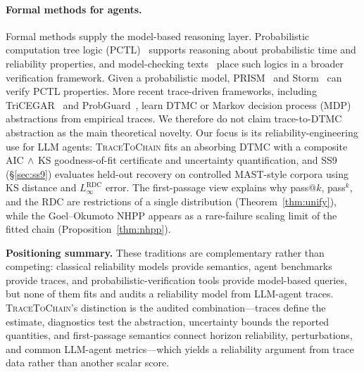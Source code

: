 \paragraph{Formal methods for agents.}
Formal methods supply the model-based reasoning layer. Probabilistic
computation tree logic (PCTL)~\cite{hansson1994pctl} supports
reasoning about probabilistic time and reliability properties, and
model-checking texts~\cite{baier2008principles} place such logics in a
broader verification framework. Given a probabilistic model,
PRISM~\cite{prism2011} and Storm~\cite{storm2017} can verify PCTL
properties. More recent trace-driven frameworks, including
TriCEGAR~\cite{tricegar2026} and ProbGuard~\cite{pro2guard2025}, learn
DTMC or Markov decision process (MDP) abstractions from empirical
traces. We therefore do not claim trace-to-DTMC abstraction as the
main theoretical novelty. Our focus is its reliability-engineering use
for LLM agents: \textsc{TraceToChain} fits an absorbing DTMC with a
composite AIC$\,\wedge\,$KS goodness-of-fit certificate and uncertainty
quantification, and SS9 (\S\ref{sec:ss9}) evaluates held-out recovery on
controlled MAST-style corpora using KS distance and
$L_\infty^{\mathrm{RDC}}$ error. The first-passage view explains why
pass$@k$, pass$^k$, and the RDC are restrictions of a single
distribution (Theorem~\ref{thm:unify}), while the Goel--Okumoto
NHPP appears as a rare-failure scaling limit of the fitted chain
(Proposition~\ref{thm:nhpp}).

\noindent\textbf{Positioning summary.}
These traditions are complementary rather than competing: classical
reliability models provide semantics, agent benchmarks provide traces,
and probabilistic-verification tools provide model-based queries, but
none of them fits and audits a reliability model from LLM-agent traces.
\textsc{TraceToChain}'s distinction is the
audited combination---traces define the estimate, diagnostics test the
abstraction, uncertainty bounds the reported quantities, and
first-passage semantics connect horizon reliability, perturbations, and
common LLM-agent metrics---which yields a reliability argument from
trace data rather than another scalar score.

